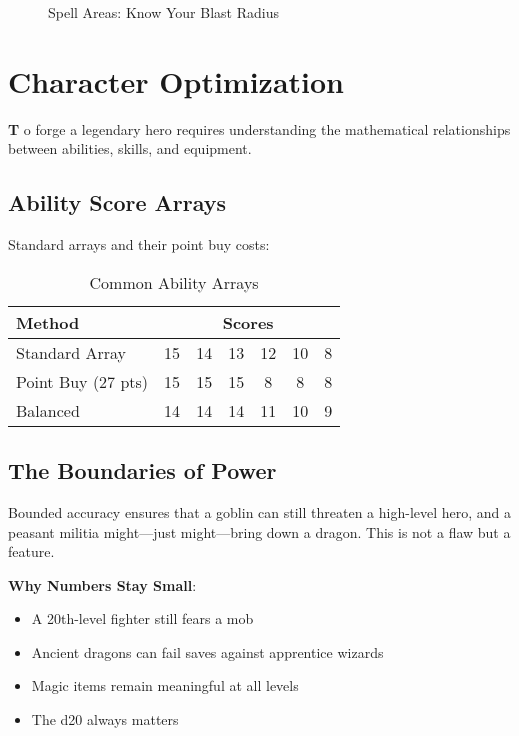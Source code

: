 \documentclass[11pt,letterpaper,openany]{book}
\newcommand{\firstletter}[1]{%
    \textcolor{bloodred}{\fontsize{48}{48}\selectfont\bfseries #1}%
}
\begin{document}
\begin{figure}[h]
\caption{Spell Areas: Know Your Blast Radius}
\end{figure}

\chapter{Character Optimization}

\firstletter{T}o forge a legendary hero requires understanding the mathematical relationships between abilities, skills, and equipment.

\section{Ability Score Arrays}

Standard arrays and their point buy costs:

\begin{table}[h]
\centering
\begin{tabular}{@{}lcccccc@{}}
\toprule
\textbf{Method} & \multicolumn{6}{c}{\textbf{Scores}} \\
\midrule
Standard Array & 15 & 14 & 13 & 12 & 10 & 8 \\
Point Buy (27 pts) & 15 & 15 & 15 & 8 & 8 & 8 \\
Balanced & 14 & 14 & 14 & 11 & 10 & 9 \\
\bottomrule
\end{tabular}
\caption{Common Ability Arrays}
\end{table}

\section{The Boundaries of Power}

Bounded accuracy ensures that a goblin can still threaten a high-level hero, and a peasant militia might—just might—bring down a dragon. This is not a flaw but a feature.

\textbf{Why Numbers Stay Small}:
\begin{itemize}
    \item A 20th-level fighter still fears a mob
    \item Ancient dragons can fail saves against apprentice wizards
    \item Magic items remain meaningful at all levels
    \item The d20 always matters
\end{itemize}
\end{document}
